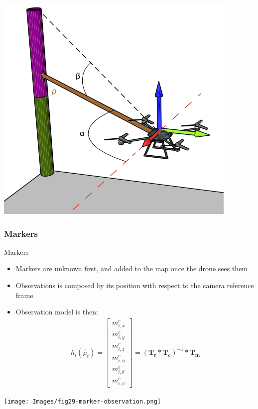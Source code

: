 \documentclass[serif]{beamer}
\begin{document}
    \begin{frame}
        \centering
        \includegraphics[width=0.6\linewidth]{Images/fig28-range-and-bearing.png}
    \end{frame}

    \subsubsection{Markers}
    \begin{frame}[nonumber]{Markers}
        \begin{itemize}
            \item{Markers are unknown first, and added to the map once the drone sees them}
            \item{Observations is composed by its position with respect to the camera reference frame}
            \item{Observation model is then: \begin{align*}
                    h_i(\hat\mu_t) = \begin{bmatrix}
                        m_{i, x}^c \\ m_{i, y}^c \\ m_{i, z}^c \\ m_{i, \phi}^c \\ m_{i, \theta}^c \\ m_{i, \psi}^c
                    \end{bmatrix} = (\bm{T_r} * \bm{T_c})^{-1} * \bm{T_m}
                \end{align*}
            }
        \end{itemize}
    \end{frame}

    \begin{frame}
        \centering
        \texttt{[image: Images/fig29-marker-observation.png]}
    \end{frame}
\end{document}
